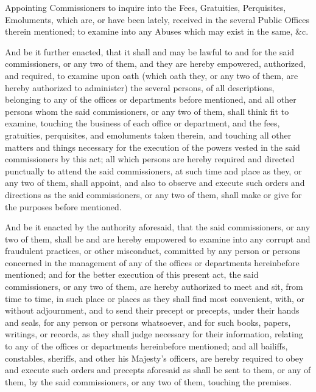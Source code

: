 


\begin{itquote}
Appointing Commissioners to inquire into the Fees, Gratuities, Perquisites, Emoluments, which are, or have been lately, received in the several Public Offices therein mentioned; to examine into any Abuses which may exist in the same, \&c.
\end{itquote}

And be it further enacted, that it shall and may be lawful to and for the said commissioners, or any two of them, and they are hereby empowered, authorized, and required, to examine upon oath (which oath they, or any two of them, are hereby authorized to administer) the several persons, of all descriptions, belonging to any of the offices or departments before mentioned, and all other persons whom the said commissioners, or any two of them, shall think fit to examine, touching the business of each office or department, and the fees, gratuities, perquisites, and emoluments taken therein, and touching all other matters and things necessary for the execution of the powers vested in the said commissioners by this act; all which persons are hereby required and directed punctually to attend the said commissioners, at such time and place as they, or any two of them, shall appoint, and also to observe and execute such orders and directions as the said commissioners, or any two of them, shall make or give for the purposes before mentioned.

And be it enacted by the authority aforesaid, that the said commissioners, or any two of them, shall be and are hereby empowered to examine into any corrupt and fraudulent practices, or other misconduct, committed by any person or persons concerned in the management of any of the offices or departments hereinbefore mentioned; and for the better execution of this present act, the said commissioners, or any two of them, are hereby authorized to meet and sit, from time to time, in such place or places as they shall find most convenient, with, or without adjournment, and to send their precept or precepts, under their hands and seals, for any person or persons whatsoever, and for such books, papers, writings, or records, as they shall judge necessary for their information, relating to any of the offices or departments hereinbefore mentioned; and all bailiffs, constables, sheriffs, and other his Majesty's officers, are hereby required to obey and execute such orders and precepts aforesaid as shall be sent to them, or any of them, by the said commissioners, or any two of them, touching the premises.

